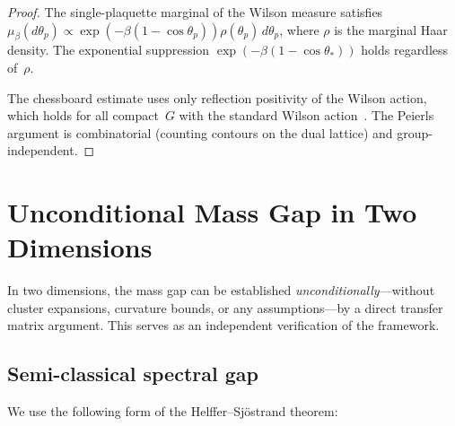 \documentclass[11pt]{article}
\theoremstyle{definition}
\begin{document}
\begin{proof}
The single-plaquette marginal of the Wilson measure
satisfies $\mu_\beta(d\theta_p)\propto
\exp(-\beta(1-\cos\theta_p))\rho(\theta_p)\,d\theta_p$,
where $\rho$ is the marginal Haar density.  The
exponential suppression $\exp(-\beta(1-\cos\theta_*))$
holds regardless of~$\rho$.

The chessboard estimate uses only reflection positivity
of the Wilson action, which holds for all compact~$G$
with the standard Wilson action~\cite{OsterwalderSeiler78}.
The Peierls argument is combinatorial (counting
contours on the dual lattice) and group-independent.
\end{proof}





\section{Unconditional Mass Gap in Two Dimensions}\label{sec:d2}

In two dimensions, the mass gap can be established
\emph{unconditionally}---without cluster expansions, curvature bounds,
or any assumptions---by a direct transfer matrix argument.
This serves as an independent verification of the framework.

\subsection{Semi-classical spectral gap}

We use the following form of the Helffer--Sj\"ostrand theorem:
\end{document}
